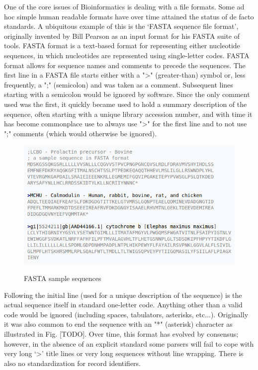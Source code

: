 \documentclass{llncs}
\begin{document}
One of the core issues of Bioinformatics is dealing with a file formats. Some ad hoc simple human readable formats have over time attained the status of de facto standards. A ubiquitous example of this is the ‘FASTA sequence file format’, originally invented by Bill Pearson as an input format for his FASTA suite of tools.
FASTA format is a text-based format for representing either nucleotide sequences, in which nucleotides are represented using single-letter codes. FASTA format allows for sequence names and comments to precede the sequences. The first line in a FASTA file starts either with a "\textgreater" (greater-than) symbol or, less frequently, a ";" (semicolon) and was taken as a comment. Subsequent lines starting with a semicolon would be ignored by software. Since the only comment used was the first, it quickly became used to hold a summary description of the sequence, often starting with a unique library accession number, and with time it has become commonplace use to always use "\textgreater" for the first line and to not use ";" comments (which would otherwise be ignored).
\begin{figure}
	\centering
	\includegraphics[width=.911\linewidth]{./figs/NGS-5}
	\label{fig:fig5}
	\caption[caption]{FASTA sample sequences}
\end{figure}
Following the initial line (used for a unique description of the sequence) is the actual sequence itself in standard one-letter code. Anything other than a valid code would be ignored (including spaces, tabulators, asterisks, etc...). Originally it was also common to end the sequence with an "*" (asterisk) character as illustrated in Fig. [TODO]. 
Over time, this format has evolved by consensus; however, in the absence of an explicit standard some parsers will fail to cope with very long ‘\textgreater’ title lines or very long sequences without line wrapping. There is also no standardization for record identifiers.
\end{document}
